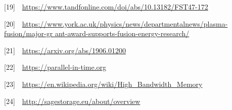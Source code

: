 \documentclass[a4paper]{article}
\begin{document}
[19]\ \ \url{https://www.tandfonline.com/doi/abs/10.13182/FST47-172}

[20]\ \ 
\url{https://www.york.ac.uk/physics/news/departmentalnews/plasma-fusion/major-gr
ant-award-supports-fusion-energy-research/}

{[21]\ \ }\url{https://arxiv.org/abs/1906.01200}

{[22]\ \ }\url{https://parallel-in-time.org}

{[23]\ \ }\url{https://en.wikipedia.org/wiki/High_Bandwidth_Memory}

{[24]\ \ }\url{http://sagestorage.eu/about/overview}


\bigskip


\bigskip
\end{document}
